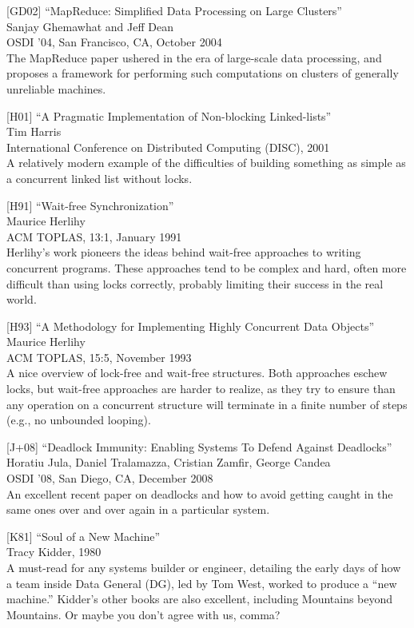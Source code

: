 {[}GD02{]} ``MapReduce: Simplified Data Processing on Large Clusters''\\
Sanjay Ghemawhat and Jeff Dean\\
OSDI '04, San Francisco, CA, October 2004\\
The MapReduce paper ushered in the era of large-scale data processing,
and proposes a framework for performing such computations on clusters of
generally unreliable machines.

{[}H01{]} ``A Pragmatic Implementation of Non-blocking Linked-lists''\\
Tim Harris\\
International Conference on Distributed Computing (DISC), 2001\\
A relatively modern example of the difficulties of building something as
simple as a concurrent linked list without locks.

{[}H91{]} ``Wait-free Synchronization''\\
Maurice Herlihy\\
ACM TOPLAS, 13:1, January 1991\\
Herlihy's work pioneers the ideas behind wait-free approaches to writing
concurrent programs. These approaches tend to be complex and hard, often
more difficult than using locks correctly, probably limiting their
success in the real world.

{[}H93{]} ``A Methodology for Implementing Highly Concurrent Data
Objects''\\
Maurice Herlihy\\
ACM TOPLAS, 15:5, November 1993\\
A nice overview of lock-free and wait-free structures. Both approaches
eschew locks, but wait-free approaches are harder to realize, as they
try to ensure than any operation on a concurrent structure will
terminate in a finite number of steps (e.g., no unbounded looping).

{[}J+08{]} ``Deadlock Immunity: Enabling Systems To Defend Against
Deadlocks''\\
Horatiu Jula, Daniel Tralamazza, Cristian Zamfir, George Candea\\
OSDI '08, San Diego, CA, December 2008\\
An excellent recent paper on deadlocks and how to avoid getting caught
in the same ones over and over again in a particular system.

{[}K81{]} ``Soul of a New Machine''\\
Tracy Kidder, 1980\\
A must-read for any systems builder or engineer, detailing the early
days of how a team inside Data General (DG), led by Tom West, worked to
produce a ``new machine.'' Kidder's other books are also excellent,
including Mountains beyond Mountains. Or maybe you don't agree with us,
comma?

